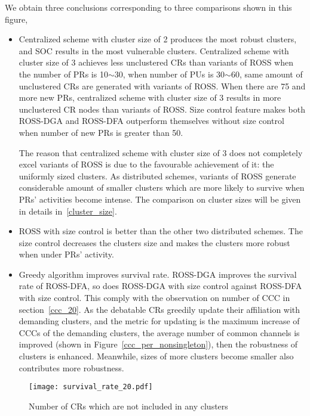We obtain three conclusions corresponding to three comparisons shown in this figure,
\begin{itemize}
\item Centralized scheme with cluster size of 2 produces the most robust clusters, and SOC results in the most vulnerable clusters.
Centralized scheme with cluster size of 3 achieves less unclustered CRs than variants of ROSS when the number of PRs is 10$\sim$30, when number of PUs is 30$\sim$60, same amount of unclustered CRs are generated with variants of ROSS.
When there are 75 and more new PRs, centralized scheme with cluster size of 3 results in more unclustered CR nodes than variants of ROSS.
Size control feature makes both ROSS-DGA and ROSS-DFA outperform themselves without size control when number of new PRs is greater than 50.

The reason that centralized scheme with cluster size of 3 does not completely excel variants of ROSS is due to the favourable achievement of it: the uniformly sized clusters.
As distributed schemes, variants of ROSS generate considerable amount of smaller clusters which are more likely to survive when PRs' activities become intense.
The comparison on cluster sizes will be given in details in~\ref{cluster_size}.

\item ROSS with size control is better than the other two distributed schemes.
The size control decreases the clusters size and makes the clusters more robust when under PRs' activity.

\item Greedy algorithm improves survival rate. 
ROSS-DGA improves the survival rate of ROSS-DFA, so does ROSS-DGA with size control against ROSS-DFA with size control.
This comply with the observation on number of CCC in section~\ref{ccc_20}.
As the debatable CRs greedily update their affiliation with demanding clusters, and the metric for updating is the maximum increase of CCCs of the demanding clusters, the average number of common channels is improved (shown in Figure~\ref{ccc_per_nonsingleton}), then the robustness of clusters is enhanced. 
Meanwhile, sizes of more clusters become smaller also contributes more robustness.

\end{itemize}

\begin{figure}[h]
  \centering
  \texttt{[image: survival\_rate\_20.pdf]}
  \caption{Number of CRs which are not included in any clusters}
  \label{singleton_clusters}
\end{figure}

